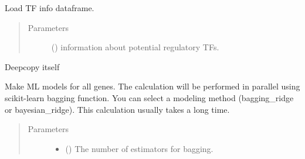 \documentclass[letterpaper,10pt,english]{sphinxmanual}
\begin{document}
\begin{fulllineitems}
\begin{fulllineitems}
\begin{quote}
\begin{description}
\end{description}\end{quote}

\end{fulllineitems}


\begin{fulllineitems}
\label{\detokenize{modules/celloracle:celloracle.Net.addTFinfo_matrix}}
Load TF info dataframe.
\begin{quote}\begin{description}
\item[{Parameters}] \leavevmode
{} () \textendash{} information about potential regulatory TFs.

\end{description}\end{quote}

\end{fulllineitems}


\begin{fulllineitems}
\label{\detokenize{modules/celloracle:celloracle.Net.copy}}
Deepcopy itself

\end{fulllineitems}


\begin{fulllineitems}
\label{\detokenize{modules/celloracle:celloracle.Net.fit_All_genes}}
Make ML models for all genes.
The calculation will be performed in parallel using scikit-learn bagging function.
You can select a modeling method (bagging\_ridge or bayesian\_ridge).  This calculation usually takes a long time.
\begin{quote}\begin{description}
\item[{Parameters}] \leavevmode\begin{itemize}
\item {} 
 () \textendash{} The number of estimators for bagging.


\end{itemize}
\end{description}
\end{quote}
\end{fulllineitems}
\end{fulllineitems}
\end{document}
